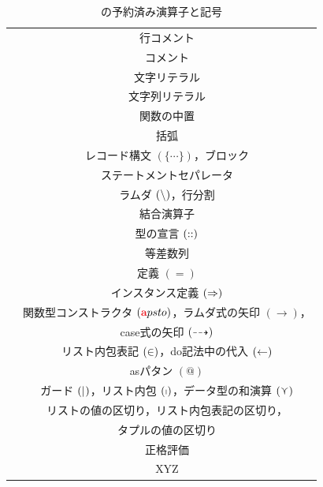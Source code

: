 \documentclass[a5paper,twoside,fleqn,draft]{jsbook}
\begin{document}
\begin{table}
\caption{\haskell の予約済み演算子と記号}
\label{tab:reserved-symbols}
\begin{center}
\begin{tabular}{||c|c||}
\hline
\code{--}&行コメント\\
\code{\{-} \code{-\}}&コメント\\
\hline
\code{'}&文字リテラル\\
\code{"}&文字列リテラル\\%
\code{`}&関数の中置\\
\code{(} \code{)}&括弧\\
\code{\{} \code{\}}&レコード構文 $(\{\dotsb\})$，ブロック\\
\code{;}&ステートメントセパレータ\\
\hline
\code{\textbackslash}&ラムダ $(\operatorname{\backslash})$，行分割\\
\code{:}&結合演算子\\
\code{::}&型の宣言 $(\operatorname{:\!:})$\\
\code{..}&等差数列\\
\code{=}&定義 $(=)$\\
\code{=>}&インスタンス定義 $(\operatorname{\Rightarrow})$\\
\code{->}&関数型コンストラクタ $(\hTypeName{a}psto)$，ラムダ式の矢印 $(\rightarrow)$，\\
&case式の矢印 $(\operatorname{\dashrightarrow})$\\
\code{<-}&リスト内包表記 $(\operatorname{\in})$，do記法中の代入 $(\operatorname{\leftarrow})$\\
\code{@}&asパタン $(@)$\\
\code{|}&ガード $(\mathop{\mid_{}})$，リスト内包 $(\operatorname{\shortmid})$，データ型の和演算 $(\operatorname{\curlyvee})$\\
\code{,}&リストの値の区切り，リスト内包表記の区切り，\\
&タプルの値の区切り\\
\hline
\code{!}&正格評価\\
\code{\textasciitilde}&XYZ\\
\hline
\end{tabular}
\end{center}
\end{table}
\end{document}
